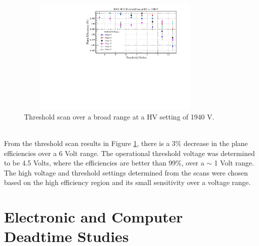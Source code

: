 \documentclass[letterpaper, 12 pt, conference]{ieeeconf}  %
\begin{document}
\begin{figure}[h!]
  \centering
  \includegraphics[width=3.8in, height=2.2in]{dc2_tests/dc2_thrsscan_HV_1940V.pdf}
  \caption{Threshold scan over a broad range at a HV setting of 1940 V.}
  \label{fig:hdc2_thrsscan}
\end{figure} \\
\indent From the threshold scan results in Figure \ref{fig:hdc2_thrsscan}, there is a 3$\%$ decrease in the plane efficiencies over a
6 Volt range. The operational threshold voltage was determined to be 4.5 Volts, where the efficiencies are better than 99$\%$, over a $\sim$ 1 Volt range.
The high voltage and threshold settings determined from the scans were chosen based on the high efficiency region and its small sensitivity over a voltage range.  


\section{Electronic and Computer Deadtime Studies}
\end{document}
